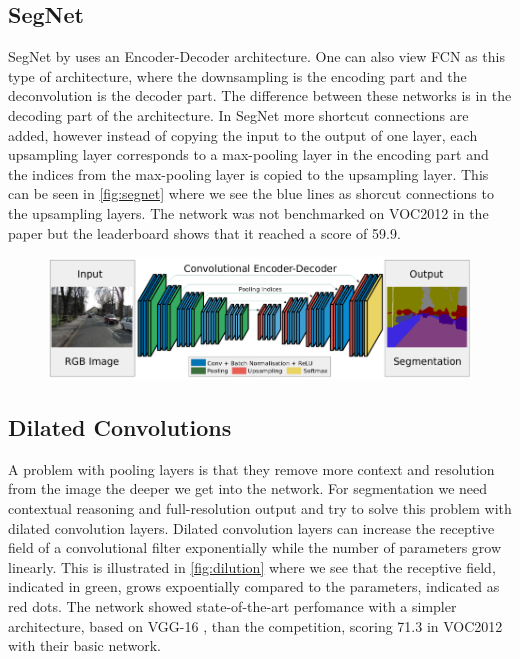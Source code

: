 \subsection{SegNet}
SegNet by \citet{Badrinarayanan2015} uses an Encoder-Decoder architecture. One can also view FCN as this type of architecture, where the downsampling is the encoding part and the deconvolution is the decoder part. The difference between these networks is in the decoding part of the architecture. In SegNet more shortcut connections are added, however instead of copying the input to the output of one layer, each upsampling layer corresponds to a max-pooling layer in the encoding part and the indices from the max-pooling layer is copied to the upsampling layer. This can be seen in \autoref{fig:segnet} where we see the blue lines as shorcut connections to the upsampling layers. The network was not benchmarked on VOC2012 in the paper but the leaderboard \cite{PASCALVOC2012a} shows that it reached a score of 59.9. 

\begin{figure}[H]
	\centering
	\includegraphics[width=0.7\linewidth]{fig/segnet.png}
	\label{fig:segnet}
\end{figure}


\subsection{Dilated Convolutions}
A problem with pooling layers is that they remove more context and resolution from the image the deeper we get into the network. For segmentation we need contextual reasoning and full-resolution output and \citet{Yu2015} try to solve this problem with dilated convolution layers. Dilated convolution layers can increase the receptive field of a convolutional filter exponentially while the number of parameters grow linearly. This is illustrated in \autoref{fig:dilution} where we see that the receptive field, indicated in green, grows expoentially compared to the parameters, indicated as red dots. The network showed state-of-the-art perfomance with a simpler architecture, based on VGG-16 \cite{Simonyan2014a}, than the competition, scoring 71.3 in VOC2012 with their basic network.

